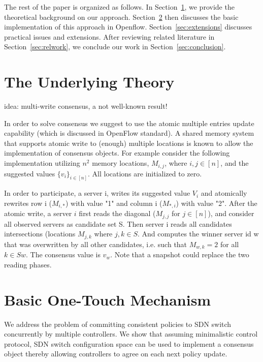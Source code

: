 \documentclass[conference]{sigcomm-alternate}
\begin{document}
%
The rest of the paper is organized as follows.
In Section~\ref{sec:background}, we provide the theoretical
background on our approach. Section~\ref{sec:realization}
then discusses the basic implementation of this approach in Openflow.
Section~\ref{sec:extensions} discusses practical issues and extensions.
After reviewing related literature in Section~\ref{sec:relwork},
we conclude our work in
Section~\ref{sec:conclusion}.


\section{The Underlying Theory}\label{sec:background}

idea: multi-write consensus, a not well-known result!

In order to solve consensus we suggest to use the atomic multiple entries update capability (which is discussed in OpenFlow standard). A shared memory system that supports atomic write to (enough) multiple locations is known to allow the implementation of consensus objects. For example consider the following implementation utilizing $n^2$ memory locations, $M_{i,j}$, where $i,j\in[n]$, and the suggested values $\{v_i\}_{i\in [n]}$. All locations are initialized to zero.

In order to participate, a server i, writes its suggested value $V_i$ and atomically rewrites row i ($M_{i,*}$) with value "1" and column i ($M_{*,i}$) with value "2". After the atomic write, a server $i$ first reads the diagonal ($M_{j,j}$ for $j\in [n]$), and consider all observed servers as candidate set S.  Then server i reads all candidates intersections (locations $M_{j,k}$ where $j,k\in S$. And computes the winner server id w that was overwritten by all other candidates, i.e. such that $M_{w,k}=2$ for all $k\in S {w}$. The consensus value is $v_w$.
Note that a snapshot could replace the two reading phases.



\section{Basic One-Touch Mechanism}\label{sec:realization}

We address the problem of committing consistent policies to SDN switch concurrently by multiple controllers.
We show that assuming minimalistic control protocol, SDN switch configuration space can be used to implement a consensus object thereby allowing controllers to agree on each next policy update.
\end{document}

